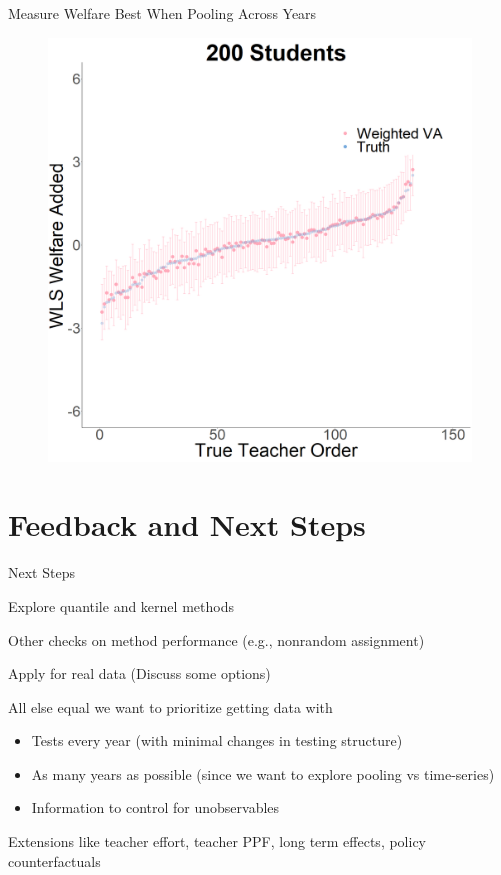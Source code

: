 \documentclass[t,aspectratio=169,11pt]{beamer}
\newenvironment{wideitemize}{\itemize\addtolength{\itemsep}{14pt}}{\enditemize}
\begin{document}
\begin{frame}{Measure Welfare Best When Pooling Across Years}
\begin{figure}
    \includegraphics[width=.3\textwidth,height=.35\textheight]{slides/Figures/ww_rawlsian_Students_200_caterpillar.png}\hfill
\end{figure}

\vfill
\end{frame}




\section{Feedback and Next Steps}

\begin{frame}[label=next]{Next Steps}

\begin{wideitemize}
    \item Explore quantile and kernel methods
    
    \hyperlink{methods}{}
    
    \item Other checks on method performance (e.g., nonrandom assignment)
    
    \item Apply for real data  (Discuss some options)
    
    \item All else equal we want to prioritize getting data with
    \begin{itemize}
        \item Tests every year (with minimal changes in testing structure)
        \item As many years as possible (since we want to explore pooling vs time-series)
        \item Information to control for unobservables \citep[e.g.,][]{schellenberg2020parents}
    \end{itemize}
    
    \item Extensions like teacher effort, teacher PPF, long term effects, policy counterfactuals
\end{wideitemize}

\end{frame}
\end{document}
